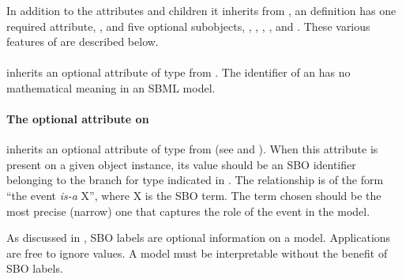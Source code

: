 \subsubsection{}

In addition to the attributes and children it inherits from \SBase,
an \Event definition has one required attribute, , and five optional subobjects, \Trigger, \Delay, \Priority, \ListOfEventAssignments, and \EventAssignment.
These various features of \Event are described below.


\vspace*{-0.25ex}
\paragraph{}
\label{sec:event-id-name}

{\Event inherits an optional  attribute of type  from \SBase.  The identifier of an \Event has no mathematical meaning in an SBML \thisLV model.}


\vspace*{-0.25ex}
\paragraph{The optional  attribute on }
\label{sec:event-sboterm}

\Event inherits an optional  attribute of type
 from \SBase (see
 and ).  When this
attribute is present on a given \Event object instance, its value
should be an SBO identifier belonging to the branch for type
\Event indicated in .  The
relationship is of the form ``the event \emph{is-a} X'', where X
is the SBO term.  The term chosen should be the most precise
(narrow) one that captures the role of the event in the model.

As discussed in , SBO labels are optional
information on a model.  Applications are free to ignore
 values.  A model must be interpretable without the
benefit of SBO labels.


